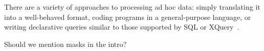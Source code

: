 
There are a variety of approaches to processing ad hoc data: 
simply translating it into a well-behaved format,
coding programs in a general-purpose language, or 
writing declarative queries similar to those supported by SQL or
XQuery~\cite{xquery}.


Should we mention masks in the intro?